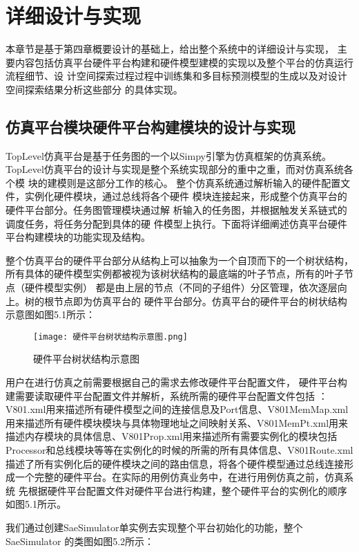 
\chapter{详细设计与实现}
本章节是基于第四章概要设计的基础上，给出整个系统中的详细设计与实现，
主要内容包括仿真平台硬件平台构建和硬件模型建模的实现以及整个平台的仿真运行流程细节、设
计空间探索过程过程中训练集和多目标预测模型的生成以及对设计空间探索结果分析这些部分
的具体实现。

\section{仿真平台模块硬件平台构建模块的设计与实现}
TopLevel仿真平台是基于任务图的一个以Simpy引擎为仿真框架的仿真系统\cite{36}。
TopLevel仿真平台的设计与实现是整个系统实现部分的重中之重，而对仿真系统各个模
块的建模则是这部分工作的核心。
整个仿真系统通过解析输入的硬件配置文件，实例化硬件模块，通过总线将各个硬件
模块连接起来，形成整个仿真平台的硬件平台部分。任务图管理模块通过解
析输入的任务图，并根据触发关系链式的调度任务，将任务分配到具体的硬
件模型上执行。下面将详细阐述仿真平台硬件平台构建模块的功能实现及结构。

整个仿真平台的硬件平台部分从结构上可以抽象为一个自顶而下的一个树状结构，
所有具体的硬件模型实例都被视为该树状结构的最底端的叶子节点，所有的叶子节点（硬件模型实例）
都是由上层的节点（不同的子组件）分区管理，依次逐层向上。树的根节点即为仿真平台的
硬件平台部分。仿真平台的硬件平台的树状结构示意图如图5.1所示：

\begin{figure}
    \centering
    \texttt{[image: 硬件平台树状结构示意图.png]}
    \caption{硬件平台树状结构示意图}
    \label{fig:badge}
\end{figure}

用户在进行仿真之前需要根据自己的需求去修改硬件平台配置文件，
硬件平台构建需要读取硬件平台配置文件并解析，系统所需的硬件平台配置文件包括
：V801.xml用来描述所有硬件模型之间的连接信息及Port信息、V801MemMap.xml
用来描述所有硬件模块模块与具体物理地址之间映射关系、V801MemPt.xml用来
描述内存模块的具体信息、V801Prop.xml用来描述所有需要实例化的模块包括
Processor和总线模块等等在实例化的时候的所需的所有具体信息、V801Route.xml
描述了所有实例化后的硬件模块之间的路由信息，将各个硬件模型通过总线连接形
成一个完整的硬件平台。在实际的用例仿真业务中，在进行用例仿真之前，仿真系统
先根据硬件平台配置文件对硬件平台进行构建，整个硬件平台的实例化的顺序如图5.1所示。

我们通过创建SaeSimulator单实例去实现整个平台初始化的功能，整个SaeSimulator
的类图如图5.2所示：

